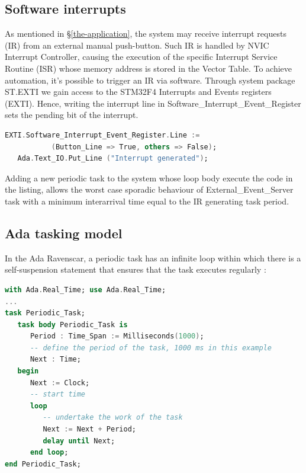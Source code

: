 \documentclass{article}
\begin{document}
\subsection{Software interrupts}
As mentioned in §\ref{the-application}, the system may receive interrupt requests (IR) from an external manual push-button.\newline
Such IR is handled by NVIC Interrupt Controller, causing the execution of the specific Interrupt Service Routine (ISR)
whose memory address is stored in the Vector Table.\newline %
To achieve automation, it's possible to trigger an IR via software.\newline
Through system package ST.EXTI we gain access to the STM32F4 Interrupts and Events registers (EXTI).
Hence, writing the interrupt line in Software\_Interrupt\_Event\_Register sets the 
pending bit of the interrupt.

\begin{lstlisting}[language=Ada]
   EXTI.Software_Interrupt_Event_Register.Line :=
           (Button_Line => True, others => False);
   Ada.Text_IO.Put_Line ("Interrupt generated");
\end{lstlisting}

Adding a new periodic task to the system whose loop body execute the code in the listing,
allows the worst case sporadic behaviour of External\_Event\_Server task with a minimum
interarrival time equal to the IR generating task period.

\subsection{Ada tasking model}

In the Ada Ravenscar, a periodic task has an infinite loop within which there is a self-suspension statement that ensures that the task executes regularly \cite{ada-tasks}:

\begin{lstlisting}[language=Ada]
with Ada.Real_Time; use Ada.Real_Time;
...
task Periodic_Task;
   task body Periodic_Task is
      Period : Time_Span := Milliseconds(1000);
      -- define the period of the task, 1000 ms in this example
      Next : Time;
   begin
      Next := Clock;
      -- start time
      loop
         -- undertake the work of the task
         Next := Next + Period;
         delay until Next;
      end loop;
end Periodic_Task;
\end{lstlisting}
\end{document}
